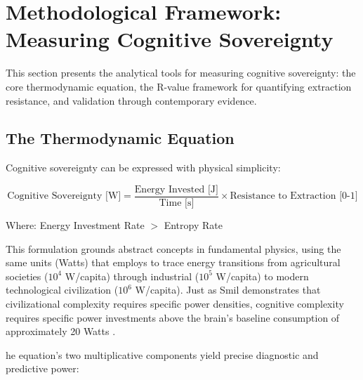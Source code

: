 %
% 
%

\section{Methodological Framework: Measuring Cognitive Sovereignty}
\label{sec:methodology}

This section presents the analytical tools for measuring cognitive sovereignty: the core thermodynamic equation, the R-value framework for quantifying extraction resistance, and validation through contemporary evidence.

\subsection{The Thermodynamic Equation}

Cognitive sovereignty can be expressed with physical simplicity:

\begin{equation}
\text{Cognitive Sovereignty [W]} = \frac{\text{Energy Invested [J]}}{\text{Time [s]}} \times \text{Resistance to Extraction [0-1]}
\label{eq:sovereignty}
\end{equation}

\noindent Where: Energy Investment Rate $>$ Entropy Rate

This formulation grounds abstract concepts in fundamental physics, using the same units (Watts) that \citet{smil2017} employs to trace energy transitions from agricultural societies ($10^4$ W/capita) through industrial ($10^5$ W/capita) to modern technological civilization ($10^6$ W/capita). Just as Smil demonstrates that civilizational complexity requires specific power densities, cognitive complexity requires specific power investments  above the brain's baseline consumption of approximately 20 Watts \citep{raichle2002}.

he equation's two multiplicative components yield precise diagnostic and predictive power:

